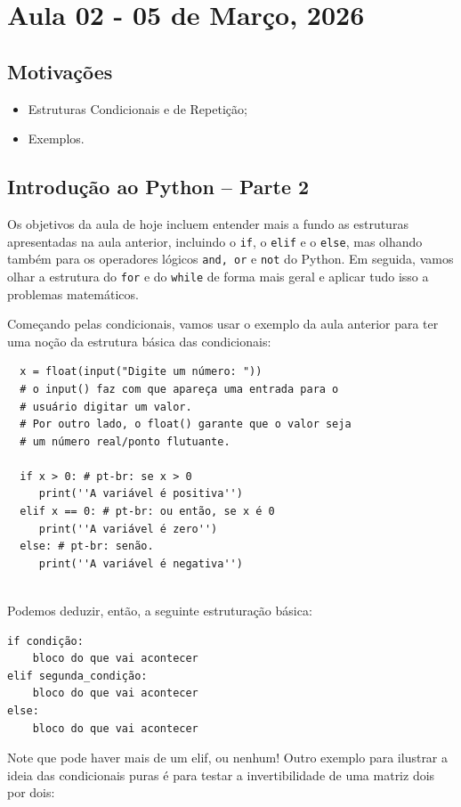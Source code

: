 \documentclass[../numerical_methods.tex]{subfiles}
\begin{document}
\section{Aula 02 - 05 de Março, 2026}
\subsection{Motivações}
\begin{itemize}
	\item Estruturas Condicionais e de Repetição;
	\item Exemplos.
\end{itemize}
\subsection{Introdução ao Python -- Parte 2}
Os objetivos da aula de hoje incluem entender mais a fundo as estruturas apresentadas na aula anterior, incluindo o \texttt{if}, o \texttt{elif} e o \texttt{else}, mas olhando também para os operadores lógicos \texttt{and, or} e \texttt{not} do Python.
Em seguida, vamos olhar a estrutura do \texttt{for} e do \texttt{while} de forma mais geral e aplicar tudo isso a problemas matemáticos.

Começando pelas condicionais, vamos usar o exemplo da aula anterior para ter uma noção da estrutura básica das condicionais:
\begin{verbatim}
  x = float(input("Digite um número: ")) 
  # o input() faz com que apareça uma entrada para o 
  # usuário digitar um valor. 
  # Por outro lado, o float() garante que o valor seja 
  # um número real/ponto flutuante.

  if x > 0: # pt-br: se x > 0
     print(''A variável é positiva'')
  elif x == 0: # pt-br: ou então, se x é 0
     print(''A variável é zero'')
  else: # pt-br: senão.
     print(''A variável é negativa'') 
    
\end{verbatim}

Podemos deduzir, então, a seguinte estruturação básica:
\begin{verbatim}
if condição:
    bloco do que vai acontecer
elif segunda_condição: 
    bloco do que vai acontecer
else: 
    bloco do que vai acontecer
\end{verbatim}
Note que pode haver mais de um elif, ou nenhum!
Outro exemplo para ilustrar a ideia das condicionais puras é para testar a invertibilidade de uma matriz dois por dois:
\end{document}
